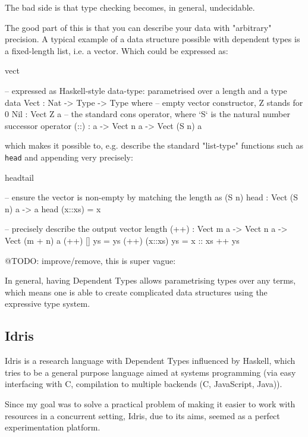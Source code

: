 The bad side is that type checking becomes, in general, undecidable.

The good part of this is that you can describe your data with "arbitrary"
precision. A typical example of a data structure possible with dependent types
is a fixed-length list, i.e. a vector. Which could be expressed as:

\begin{SaveVerbatim}{vect}

-- expressed as Haskell-style data-type: parametrised over a length and a type
data Vect : Nat -> Type -> Type where
  -- empty vector constructor, Z stands for 0
  Nil  : Vect Z a
  -- the standard cons operator, where `S` is the natural number successor operator
  (::) : a -> Vect n a -> Vect (S n) a

\end{SaveVerbatim}

which makes it possible to, e.g. describe the standard "list-type" functions
such as \texttt{head} and appending very precisely:

\begin{SaveVerbatim}{headtail}

-- ensure the vector is non-empty by matching the length as (S n)
head : Vect (S n) a -> a
head (x::xs) = x

-- precisely describe the output vector length
(++) : Vect m a -> Vect n a -> Vect (m + n) a
(++) []      ys = ys
(++) (x::xs) ys = x :: xs ++ ys

\end{SaveVerbatim}

@TODO: improve/remove, this is super vague:

In general, having Dependent Types allows parametrising types over any terms,
which means one is able to create complicated data structures using the
expressive type system.

\subsection{Idris}

Idris is a research language with Dependent Types influenced by Haskell, which
tries to be a general purpose language aimed at systems programming (via easy
interfacing with C, compilation to multiple backends (C, JavaScript, Java)).

Since my goal was to solve a practical problem of making it easier to work with
resources in a concurrent setting, Idris, due to its aims, seemed as a perfect
experimentation platform.
